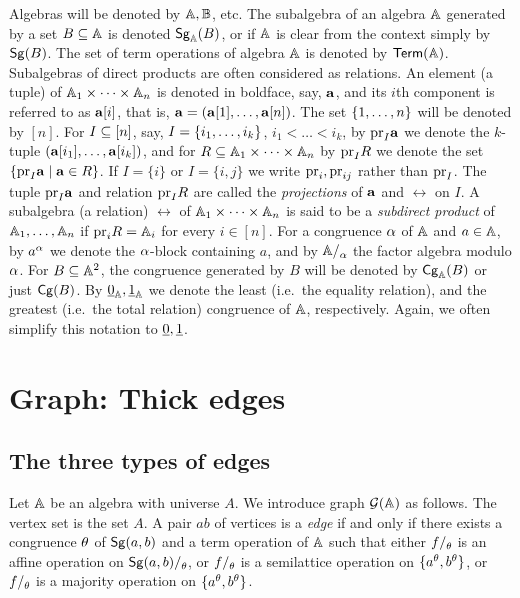 \documentclass[11pt]{article}
\begin{document}
Algebras will be denoted by ${\mathbb A},{\mathbb B}$, etc. The subalgebra of an algebra ${\mathbb A}$ generated by 
a set $B\subseteq{\mathbb A}$ is denoted ${\sf Sg}_{{\mathbb A}}(B)$, or if ${\mathbb A}$ is clear from the context simply by
${\sf Sg}(B)$. The set of term operations of algebra ${\mathbb A}$ is denoted by ${\sf Term}({\mathbb A})$.
Subalgebras of direct products are often considered as relations. An element
(a tuple) of ${\mathbb A} _1\times\dots\times {\mathbb A} _{n}$ is denoted in boldface, say, ${\bf a}$, and its $i$th component
is referred to as ${\bf a}[i]$, that is, ${\bf a}=({\bf a}[1],\ldots,{\bf a}[n])$. The set $\{1,\ldots, n\}$ will be denoted 
by $[n]$. For $I\subseteq[n]$, say, $I=\{i _1,\ldots, i _{k}\}$, $i_1<\dots<i_k$, by ${\rm pr}_I{\bf a}$ we denote
the $k$-tuple $({\bf a}[i_1],\ldots,{\bf a}[i_k])$, and for $R\subseteq{\mathbb A} _1\times\dots\times {\mathbb A} _{n}$ by ${\rm pr}_IR$
we denote the set $\{{\rm pr}_I{\bf a}\mid{\bf a}\in R\}$. If $I=\{i\}$ or $I=\{i,j\}$ we write 
${\rm pr}_i,{\rm pr}_{ij}$ rather than ${\rm pr}_I$. The tuple ${\rm pr}_I{\bf a}$ and relation ${\rm pr}_IR$ are called
the \emph{projections} of ${\bf a}$ and $\rel$ on $I$. A subalgebra (a relation) $\rel$
of ${\mathbb A} _1\times\dots\times {\mathbb A} _{n}$ is said to be a \emph{subdirect product} of ${\mathbb A} _1,\ldots, {\mathbb A} _{n}$ if ${\rm pr}_iR={\mathbb A}_i$
for every $i\in[n]$. For a congruence $\alpha$ of ${\mathbb A}$ and $a\in{\mathbb A}$, by $a^\alpha$ we denote 
the $\alpha$-block containing $a$, and by $\zA\fac\al$ the factor algebra modulo $\alpha$.
For $B\subseteq{\mathbb A}^2$, the congruence generated by $B$ will be denoted by ${\sf Cg}_{{\mathbb A}}(B)$
or just ${\sf Cg}(B)$. By ${\underline 0}_{\mathbb A},{\underline 1}_{\mathbb A}$ we denote the least (i.e.\ the equality relation),
and the greatest (i.e.\ the total relation) congruence of ${\mathbb A}$, respectively. Again, we 
often simplify this notation to ${\underline 0},{\underline 1}$.



\section{Graph: Thick edges}\label{sec:thick}


\subsection{The three types of edges}\label{sec:three-types}

Let ${\mathbb A}$ be an algebra with universe $A$.
We introduce graph ${\mathcal G}({\mathbb A})$  as follows. The vertex set
is the set $A$. A pair $ab$ of vertices is a \emph{edge} if and only if
there exists a congruence $\theta$ of ${\sf Sg}(a,b)$ and a term operation of ${\mathbb A}$ such 
that either $f\fac\th$ is an affine 
operation on $\Sg{a,b}\fac\th$, or $f\fac\th$ is a semilattice operation on
$\{a^\theta,b^\theta\}$, or $f\fac\th$ is a majority operation on
$\{a^\theta,b^\theta\}$. 
\end{document}
